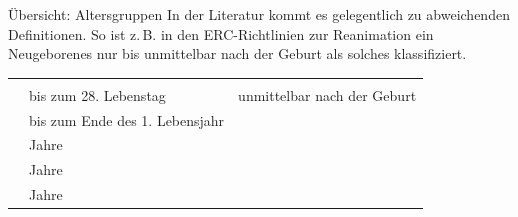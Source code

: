 \begin{Synopsis}
\end{Synopsis}



\Table
{Übersicht: Altersgruppen}%
{In der Literatur kommt es
gelegentlich zu abweichenden Definitionen. So ist z.\,B. in den
ERC-Richtlinien zur Reanimation ein Neugeborenes nur bis
unmittelbar nach der Geburt als solches
klassifiziert.}%
{\label{tab:altersgruppen-kinder}}%
{}%
{}%
{%
\begin{tabulary}{\linewidth}{LLL}\addlinespace\toprule\addlinespace
\noindent{}&\noindent{}&\noindent{}
\\\addlinespace\midrule\addlinespace
\noindent{} & bis zum 28. Lebenstag & unmittelbar nach der Geburt
\\\addlinespace
\noindent{} & bis zum Ende des 1. Lebensjahr
\\\addlinespace
\noindent{} &  Jahre
\\\addlinespace
\noindent{} &  Jahre
\\\addlinespace
\noindent{} &  Jahre
\\\bottomrule
\end{tabulary}
}%
{}%





